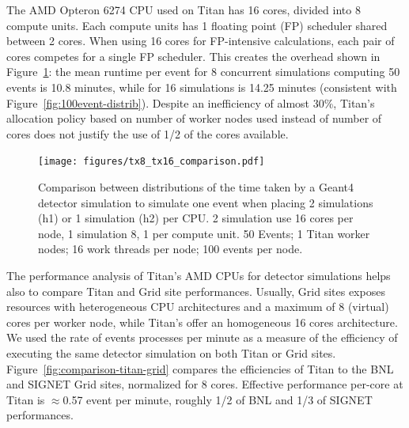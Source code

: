 

The AMD Opteron 6274 CPU used on Titan has 16 cores, divided into 8 compute
units. Each compute units has 1 floating point (FP) scheduler shared between 2
cores. When using 16 cores for FP-intensive calculations, each pair of cores
competes for a single FP scheduler. This creates the overhead shown in
Figure~\ref{fig:comparison-8-16cores}: the mean runtime per event for 8
concurrent simulations computing 50 events is 10.8 minutes, while for 16
simulations is 14.25 minutes (consistent with
Figure~\ref{fig:100event-distrib}). Despite an inefficiency of almost 30\%,
Titan's allocation policy based on number of worker nodes used instead of number
of cores does not justify the use of 1/2 of the cores available.

\begin{figure}[htp]
    \texttt{[image: figures/tx8\_tx16\_comparison.pdf]}
    \caption{Comparison between distributions of the time taken by a Geant4
    detector simulation to simulate one event when placing 2 simulations (h1) or
    1 simulation (h2) per CPU. 2 simulation use 16 cores per node, 1 simulation
    8, 1 per compute unit. 50 Events; 1 Titan worker nodes; 16 work threads per
    node; 100 events per node.}
\label{fig:comparison-8-16cores}
\end{figure}

The performance analysis of Titan's AMD CPUs for detector simulations helps also
to compare Titan and Grid site performances. Usually, Grid sites exposes
resources with heterogeneous CPU architectures and a maximum of 8 (virtual)
cores per worker node, while Titan's offer an homogeneous 16 cores architecture.
We used the rate of events processes per minute as a measure of the efficiency
of executing the same detector simulation on both Titan or Grid sites.
Figure~\ref{fig:comparison-titan-grid} compares the efficiencies of Titan to the
BNL and SIGNET Grid sites, normalized for 8 cores. Effective performance
per-core at Titan is $\approx$0.57 event per minute, roughly 1/2 of BNL and 1/3
of SIGNET performances.

